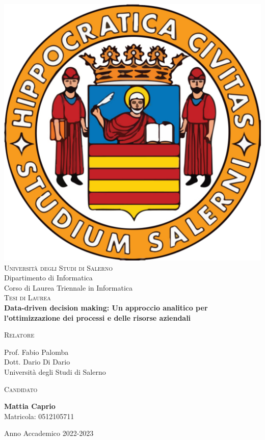 \begin{titlepage}
\changepage{}{}{}{-7.5 mm}{}{}{}{}{}


\begin{center}
\vspace{0.5cm}
\includegraphics [width=.15\columnwidth, angle=0]{covermatter/figure/logo-unisa}\\ %
{\Large \scshape Università degli Studi di Salerno}\\
\vspace{0.5cm}
{\Large Dipartimento di Informatica}\\
\vspace{0.5cm}
{\Large Corso di Laurea Triennale in Informatica}\\
\vspace{1.5cm}
{\Large \scshape Tesi di Laurea} \\
\vspace{3cm}
{\Huge \bfseries Data-driven decision making: Un approccio analitico per l'ottimizzazione dei processi e delle risorse aziendali} \\
\vspace{3cm}

\begin{minipage}[t]{7cm}
\flushleft
{\large \textsc{Relatore}}

{\large Prof. Fabio Palomba} \\
{\large Dott. Dario Di Dario} \\
Università degli Studi di Salerno \\[0.25cm]
\end{minipage}
\hfill
\begin{minipage}[t]{7cm}
\flushright
{\large \textsc{Candidato}}

{\large \textbf{Mattia Caprio}} \\
Matricola: 0512105711
\end{minipage}

\vspace{3cm}

{\small Anno Accademico 2022-2023} %
%
%
\end{center}

\end{titlepage}
